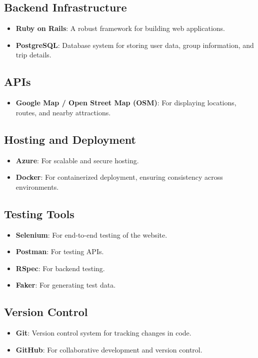 \documentclass[12pt,a4paper]{report}
\begin{document}
\subsection{Backend Infrastructure}
\begin{itemize}
    \item \textbf{Ruby on Rails}: A robust framework for building web applications.
    \item \textbf{PostgreSQL}: Database system for storing user data, group information, and trip details.
\end{itemize}

\subsection{APIs}
\begin{itemize}
    \item \textbf{Google Map / Open Street Map (OSM)}: For displaying locations, routes, and nearby attractions.
\end{itemize}

\subsection{Hosting and Deployment}
\begin{itemize}
    \item \textbf{Azure}: For scalable and secure hosting.
    \item \textbf{Docker}: For containerized deployment, ensuring consistency across environments.
\end{itemize}

\subsection{Testing Tools}
\begin{itemize}
    \item \textbf{Selenium}: For end-to-end testing of the website.
    \item \textbf{Postman}: For testing APIs.
    \item \textbf{RSpec}: For backend testing.
    \item \textbf{Faker}: For generating test data.
\end{itemize}

\subsection*{Version Control}
\begin{itemize}
    \item \textbf{Git}: Version control system for tracking changes in code.
    \item \textbf{GitHub}: For collaborative development and version control.
\end{itemize}
\end{document}

